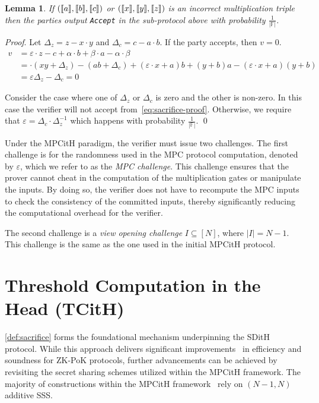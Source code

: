 \documentclass[11pt]{report}
\theoremstyle{definition}
\theoremstyle{plain}
\newtheorem{lemma}{Lemma}[section]
\begin{document}
\begin{lemma}\label{lem:sacrifice_soundness}
  If $(\llbracket a \rrbracket, \llbracket b \rrbracket, \llbracket c \rrbracket)$ or $(\llbracket x \rrbracket, \llbracket y \rrbracket, \llbracket z \rrbracket)$ is an incorrect multiplication triple then the parties output \texttt{Accept} in the sub-protocol above with probability $\frac{1}{|\mathbb{F}|}$.
\end{lemma}

\textit{Proof}. Let $\Delta_z = z - x \cdot y$ and $\Delta_c = c - a \cdot b$. If the party accepts, then $v = 0$.
\begin{align}
  v & = \varepsilon \cdot z - c + \alpha \cdot b + \beta \cdot a - \alpha \cdot \beta                           \nonumber             \\
    & = \cdot (xy + \Delta_z ) - (ab + \Delta_c) + (\varepsilon \cdot x + a)b + (y + b)a - (\varepsilon \cdot x + a)(y + b) \nonumber \\
    & = \varepsilon\Delta_z - \Delta_c = 0 \label{eq:sacrifice-proof}
\end{align}

Consider the case where one of $\Delta_z$ or $\Delta_c$ is zero and the other is non-zero. In this case the verifier will not accept from~\ref{eq:sacrifice-proof}. Otherwise, we require that $\varepsilon = \Delta_c \cdot \Delta_z^{-1}$ which happens with probability $\frac{1}{|\mathbb{F}|}$. \qed

Under the MPCitH paradigm, the verifier must issue two challenges. The first challenge is for the randomness used in the MPC protocol computation, denoted by $\varepsilon$, which we refer to as the \textit{MPC challenge}. This challenge ensures that the prover cannot cheat in the computation of the multiplication gates or manipulate the inputs. By doing so, the verifier does not have to recompute the MPC inputs to check the consistency of the committed inputs, thereby significantly reducing the computational overhead for the verifier.

The second challenge is a \textit{view opening challenge} $I \subseteq [N]$, where $|I| = N-1$. This challenge is the same as the one used in the initial MPCitH protocol.

\section{Threshold Computation in the Head (TCitH)}\label{sec:threshold-mpc}

\autoref{def:sacrifice} forms the foundational mechanism underpinning the SDitH protocol. While this approach delivers significant improvements~\cite{baum2020concretely,feneuil2022syndrome} in efficiency and soundness for ZK-PoK protocols, further advancements can be achieved by revisiting the secret sharing schemes utilized within the MPCitH framework. The majority of constructions within the MPCitH framework~\cite{baum2020concretely,feneuil2022syndrome,katz2018improved} rely on $(N-1, N)$ additive SSS.
\end{document}
